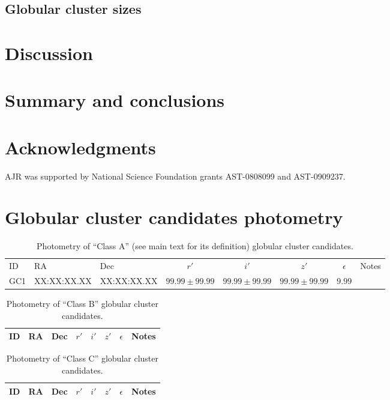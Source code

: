 \documentclass[useAMS,usenatbib]{mn2e}
\begin{document}
\subsection{Globular cluster sizes}
\label{sec:gc_sizes}


\section{Discussion}
\label{sec:discussion}

\section{Summary and conclusions}
\label{sec:conclusions}


\section*{Acknowledgments}

AJR was supported by National Science Foundation grants AST-0808099
and AST-0909237.




\appendix
\section{Globular cluster candidates photometry}
\label{sec:appendix}
\begin{table}
 \centering
 \caption{Photometry of ``Class A'' (see main text for its definition) globular cluster candidates.}
\label{tab:class_a}  
\begin{tabular}{@{}lllccccl@{}}
  \hline
ID & RA & Dec &$r'$& $i'$& $z'$& $\epsilon$& Notes\\
GC1 & XX:XX:XX.XX & XX:XX:XX.XX & $99.99 \pm 99.99$ & $99.99 \pm 99.99$ & $99.99 \pm 99.99$ & $ 9.99$& \\
 \hline

\hline
\end{tabular}
\end{table}

\begin{table}
 \centering
  \caption{Photometry of ``Class B'' globular cluster candidates.}
\label{tab:class_b}  
\begin{tabular}{@{}lllccccl@{}}
  \hline
ID & RA & Dec &$r'$& $i'$& $z'$& $\epsilon$& Notes\\
 \hline

\hline
\end{tabular}
\end{table}

\begin{table}
 \centering
  \caption{Photometry of ``Class C'' globular cluster candidates.}
\label{tab:class_c}  
\begin{tabular}{@{}lllccccl@{}}
  \hline
ID & RA & Dec &$r'$& $i'$& $z'$& $\epsilon$& Notes\\
 \hline

\hline
\end{tabular}
\end{table}

\bsp
\label{lastpage}
\end{document}
